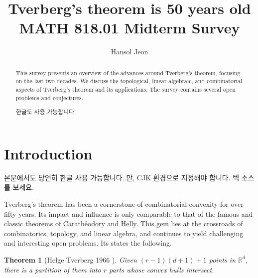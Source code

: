 \documentclass[11pt]{article}
\title{Tverberg's theorem is 50 years old\\
	\large MATH 818.01 Midterm Survey
}
\author{Hansol Jeon}
\date{}
\newtheorem{theorem}{Theorem}
\newcommand{\rr}{\mathbb{R}}
\DeclareMathOperator{\conv}{conv}
\begin{document}
	
	\maketitle
	
	\begin{abstract}
		This survey presents an overview of the advances around Tverberg's theorem, focusing on the last two decades.  We discuss the topological, linear-algebraic, and combinatorial aspects of Tverberg's theorem and its applications.  The survey contains several open problems and conjectures.
		\begin{CJK}{UTF8}{mj}
			한글도 사용 가능합니다.
		\end{CJK}
	\end{abstract}
	
	\section{Introduction}\label{section-introduction}
	
	\begin{CJK}{UTF8}{mj}
		본문에서도 당연히 한글 사용 가능합니다..만, CJK 환경으로 지정해야 합니다. 텍 소스를 보세요.
	\end{CJK}
	
	Tverberg's theorem has been a cornerstone of combinatorial convexity for over fifty years. Its impact and influence is only comparable to that of the famous and classic theorems of Carath\'eodory and Helly. This gem lies at the crossroads of combinatorics, topology, and linear algebra, and continues to yield challenging and interesting open problems.  Its states the following.%
	
	\begin{theorem}[Helge Tverberg 1966 \cite{Tverberg:1966tb}]
		Given $(r-1)(d+1)+1$ points in $\rr^d$, there is a partition of them into $r$ parts whose convex hulls intersect.
	\end{theorem}
	
\end{document}
